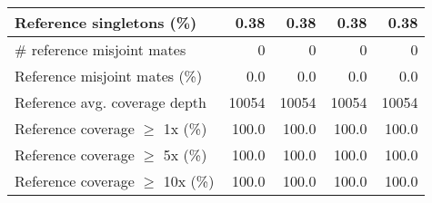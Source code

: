 \documentclass[12pt,a4paper]{article}
\begin{document}
\begin{table}[ht]
\begin{center}
\begin{tabular}{|l*{4}{|r}|}
Reference singletons (\%) & 0.38 & 0.38 & 0.38 & 0.38 \\ \hline
\# reference misjoint mates & 0 & 0 & 0 & 0 \\ \hline
Reference misjoint mates (\%) & 0.0 & 0.0 & 0.0 & 0.0 \\ \hline
Reference avg. coverage depth & 10054 & 10054 & 10054 & 10054 \\ \hline
Reference coverage $\geq$ 1x (\%) & 100.0 & 100.0 & 100.0 & 100.0 \\ \hline
Reference coverage $\geq$ 5x (\%) & 100.0 & 100.0 & 100.0 & 100.0 \\ \hline
Reference coverage $\geq$ 10x (\%) & 100.0 & 100.0 & 100.0 & 100.0 \\ \hline
\end{tabular}
\end{center}
\end{table}
\end{document}
